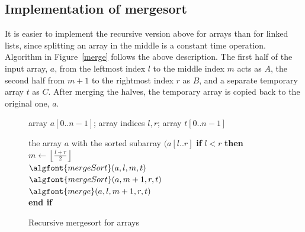 \subsection*{Implementation of mergesort}

It is easier to implement the recursive version above for arrays than for 
linked  lists, since splitting an array in the middle is a constant time operation. 
Algorithm  in Figure~\ref{merge} follows the above
description. The first half of the input array, \(a\), from the leftmost index 
$l$ to the middle index $m$ acts as $A$, the second half from $m + 1$ to the 
rightmost index $r$ as $B$, and a separate temporary array \({t}\) as ${C}$. 
After merging the halves, the temporary array is copied back to the original 
one, \(a\).

\begin{figure}[htb!]
\hspace*{.5in}\begin{minipage}{5in}
{
\begin{minipage}[t]{5in}
array $a[0..n-1]$; array indices $l, r$; array $t[0..n-1]$\\
\end{minipage}
}
{the array $a$ with the sorted subarray $(a[l..r]$}
{
\> \textbf{if} $l < r$ \textbf{then} \\
\> \> $m \leftarrow \left \lfloor \frac{l+r}{2} \right \rfloor$\\
\> \>$\algfont{mergeSort}(a, l, m, t )$ \\
\> \>$\algfont{mergeSort}(a, m + 1,r, t )$ \\
\> \>$\algfont{merge}(a, l, m+1, r, t )$ \\
\> \textbf{end if}\\
}
\end{minipage}
\caption{\label{mergesort} Recursive mergesort for arrays}
\end{figure} 


